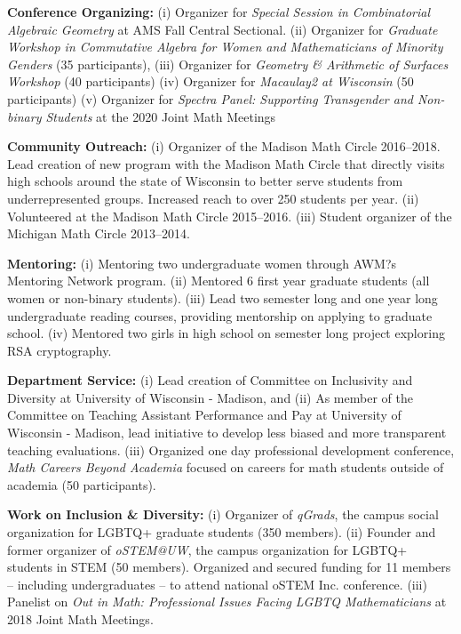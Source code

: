 \documentclass[svgnames,11pt]{article}
\begin{document}
\begin{bibenum}[itemsep=4pt]

    \item \textbf{Conference Organizing:}
        (i) Organizer for \textit{Special Session in Combinatorial Algebraic Geometry} at AMS Fall Central Sectional. 
        (ii) Organizer for \textit{Graduate Workshop in Commutative Algebra for Women and Mathematicians of Minority Genders} (35 participants), 
        (iii) Organizer for \textit{Geometry \& Arithmetic of Surfaces Workshop} (40 participants)
        (iv) Organizer for \textit{Macaulay2 at Wisconsin} (50 participants)
        (v) Organizer for \textit{Spectra Panel: Supporting Transgender and Non-binary Students} at the 2020 Joint Math Meetings
    

    \item \textbf{Community Outreach:}
    	(i) Organizer of the Madison Math Circle 2016--2018. Lead creation of new program with the Madison Math Circle that directly visits high schools around the state of Wisconsin to better serve students from underrepresented groups. Increased reach to over 250 students per year.
	(ii)  Volunteered at the Madison Math Circle 2015--2016.
	(iii) Student organizer of the Michigan Math Circle 2013--2014.

    \item \textbf{Mentoring:}
        (i) Mentoring two undergraduate women through AWM?s Mentoring Network program.
        (ii) Mentored 6 first year graduate students (all women or non-binary students).
        (iii) Lead two semester long and one year long undergraduate reading courses, providing mentorship on applying to graduate school.
        (iv) Mentored two girls in high school on semester long project exploring RSA cryptography.
        
           
    \item \textbf{Department Service:} 
    (i) Lead creation of Committee on Inclusivity and Diversity at University of Wisconsin - Madison, and 
    (ii) As member of the Committee on Teaching Assistant Performance and Pay at University of Wisconsin - Madison, lead initiative to develop less biased and more transparent teaching evaluations. 
    (iii) Organized one day professional development conference, \textit{Math Careers Beyond Academia} focused on careers for math students outside of academia (50 participants). 

    \item \textbf{Work on Inclusion \& Diversity:}
    (i) Organizer of \textit{qGrads}, the campus social organization for LGBTQ+ graduate students (350 members).
    (ii) Founder and former organizer of \textit{oSTEM@UW}, the campus organization for LGBTQ+ students in STEM (50 members). Organized and secured funding for 11 members -- including undergraduates -- to attend national oSTEM Inc. conference. 
    (iii) Panelist on \textit{Out in Math: Professional Issues Facing LGBTQ Mathematicians} at 2018 Joint Math Meetings. 
      

\end{bibenum}
\end{document}
